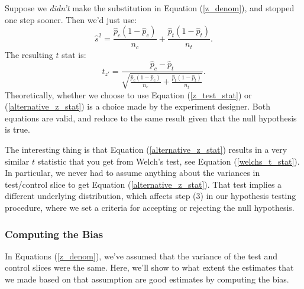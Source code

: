 \documentclass{article}
\numberwithin{equation}{section}
\begin{document}
Suppose we \textit{didn't} make the substitution in Equation (\ref{z_denom}), and stopped one step sooner. Then we'd just use:
\begin{equation} \label{alternative_z_denom}
	\hat{s}^2 = \frac{\hat{p}_c(1-\hat{p}_c)}{n_c} + \frac{\hat{p}_t(1-\hat{p}_t)}{n_t}.
\end{equation}
The resulting $t$ stat is:
\begin{equation} \label{alternative_z_stat}
	t_{z'} = \frac{\hat{p}_c - \hat{p}_t}{\sqrt{\frac{\hat{p}_c(1-\hat{p}_c)}{n_c} + \frac{\hat{p}_t(1-\hat{p}_t)}{n_t}}}.
\end{equation}
Theoretically, whether we choose to use Equation (\ref{z_test_stat}) or (\ref{alternative_z_stat}) is a choice made by the experiment designer. Both equations are valid, and reduce to the same result given that the null hypothesis is true.

The interesting thing is that Equation (\ref{alternative_z_stat}) results in a very similar $t$ statistic that you get from Welch's test, see Equation (\ref{welchs_t_stat}). In particular, we never had to assume anything about the variances in test/control slice to get Equation (\ref{alternative_z_stat}). That test implies a different underlying distribution, which affects step (3) in our hypothesis testing procedure, where we set a criteria for accepting or rejecting the null hypothesis.

\subsubsection{Computing the Bias}
In Equations (\ref{z_denom}), we've assumed that the variance of the test and control slices were the same. Here, we'll show to what extent the estimates that we made based on that assumption are good estimates by computing the bias. 
\end{document}
